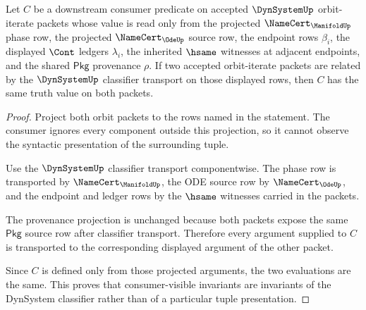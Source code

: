 \begin{theorem}
\label{thm:dynsystem-invariant-consumer-projection}
Let $C$ be a downstream consumer predicate on accepted $\DynSystemUp$ orbit-iterate packets whose value is read only from the projected $\NameCert_{\ManifoldUp}$ phase row, the projected $\NameCert_{\OdeUp}$ source row, the endpoint rows $\beta_i$, the displayed $\Cont$ ledgers $\lambda_i$, the inherited $\hsame$ witnesses at adjacent endpoints, and the shared $\mathsf{Pkg}$ provenance $\rho$. If two accepted orbit-iterate packets are related by the $\DynSystemUp$ classifier transport on those displayed rows, then $C$ has the same truth value on both packets.
\end{theorem}
\begin{proof}
Project both orbit packets to the rows named in the statement. The consumer ignores every component outside this projection, so it cannot observe the syntactic presentation of the surrounding tuple.

Use the $\DynSystemUp$ classifier transport componentwise. The phase row is transported by $\NameCert_{\ManifoldUp}$, the ODE source row by $\NameCert_{\OdeUp}$, and the endpoint and ledger rows by the $\hsame$ witnesses carried in the packets.

The provenance projection is unchanged because both packets expose the same $\mathsf{Pkg}$ source row after classifier transport. Therefore every argument supplied to $C$ is transported to the corresponding displayed argument of the other packet.

Since $C$ is defined only from those projected arguments, the two evaluations are the same. This proves that consumer-visible invariants are invariants of the DynSystem classifier rather than of a particular tuple presentation.
\end{proof}


